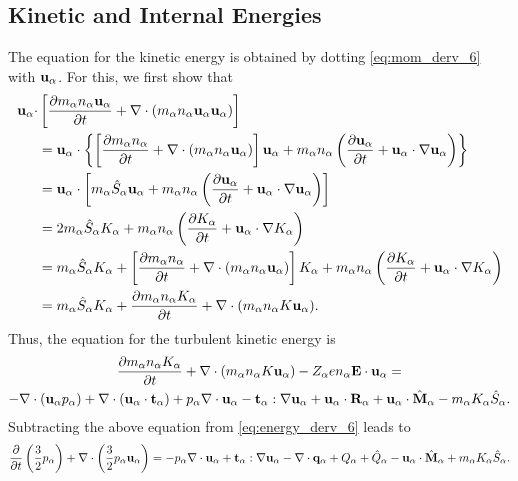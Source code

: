 \documentclass[a4paper,11pt]{report}
\begin{document}
\subsection{Kinetic and Internal Energies}
The equation for the kinetic energy is obtained by dotting \cref{eq:mom_derv_6} with $\mathbf{u}_\alpha$. For this, we first show that
\begin{align}
    \mathbf{u}_\alpha \cdot &\left [ \frac{\partial m_\alpha n_\alpha \mathbf{u}_\alpha}{\partial t} + \nabla \cdot \left ( m_\alpha n_\alpha \mathbf{u}_\alpha \mathbf{u}_\alpha \right) \right ] \\
    & =\mathbf{u}_\alpha \cdot \left \{ \left [ \frac{\partial m_\alpha n_\alpha }{\partial t} + \nabla \cdot \left ( m_\alpha n_\alpha \mathbf{u}_\alpha \right) \right] \mathbf{u}_\alpha  + m_\alpha n_\alpha \left ( \frac{\partial \mathbf{u}_\alpha}{\partial t} + \mathbf{u}_\alpha \cdot \nabla \mathbf{u}_\alpha \right ) \right \}\\
    & =\mathbf{u}_\alpha \cdot \left [ m_\alpha \hat{S}_\alpha \mathbf{u}_\alpha  + m_\alpha n_\alpha \left ( \frac{\partial \mathbf{u}_\alpha}{\partial t} + \mathbf{u}_\alpha \cdot \nabla \mathbf{u}_\alpha \right ) \right ] \\
    & =2m_\alpha \hat{S}_\alpha K_\alpha + m_\alpha n_\alpha \left ( \frac{\partial K_\alpha}{\partial t} + \mathbf{u}_\alpha \cdot \nabla K_\alpha \right) \\
    & =m_\alpha \hat{S}_\alpha K_\alpha + \left [ \frac{\partial m_\alpha n_\alpha}{\partial t} + \nabla \cdot \left (m_\alpha n_\alpha \mathbf{u}_\alpha \right ) \right] K_\alpha + m_\alpha n_\alpha \left ( \frac{\partial K_\alpha}{\partial t} + \mathbf{u}_\alpha \cdot \nabla K_\alpha \right) \\
    & =m_\alpha \hat{S}_\alpha K_\alpha + \frac{\partial m_\alpha n_\alpha K_\alpha}{\partial t} + \nabla \cdot ( m_\alpha n_\alpha K \mathbf{u}_\alpha ).
\end{align}
Thus, the equation for the turbulent kinetic energy is
\begin{multline}
\frac{\partial m_\alpha n_\alpha K_\alpha}{\partial t} + \nabla \cdot ( m_\alpha n_\alpha K \mathbf{u}_\alpha ) - Z_\alpha e n_\alpha \mathbf{E} \cdot \mathbf{u}_\alpha =\\
-\nabla \cdot ( \mathbf{u}_\alpha p_\alpha ) + \nabla \cdot (\mathbf{u}_\alpha \cdot \mathbf{t}_\alpha ) + p_\alpha \nabla \cdot \mathbf{u}_\alpha - \mathbf{t}_\alpha : \nabla \mathbf{u}_\alpha + \mathbf{u}_\alpha \cdot \mathbf{R}_\alpha + \mathbf{u}_\alpha \cdot \hat{\mathbf{M}}_\alpha - m_\alpha K_\alpha \hat{S}_\alpha .
\end{multline}
Subtracting the above equation from \cref{eq:energy_derv_6} leads to 
\begin{equation}
\frac{\partial}{\partial t} \left ( \frac{3}{2} p_\alpha \right ) + \nabla \cdot \left ( \frac{3}{2} p_\alpha \mathbf{u}_\alpha \right ) = -p_\alpha \nabla \cdot \mathbf{u}_\alpha + \mathbf{t}_\alpha : \nabla \mathbf{u}_\alpha - \nabla \cdot \mathbf{q}_\alpha + Q_{\alpha} + \hat{Q}_\alpha - \mathbf{u}_\alpha \cdot \hat{\mathbf{M}}_\alpha + m_\alpha K_\alpha \hat{S}_\alpha .
\end{equation}
\end{document}
